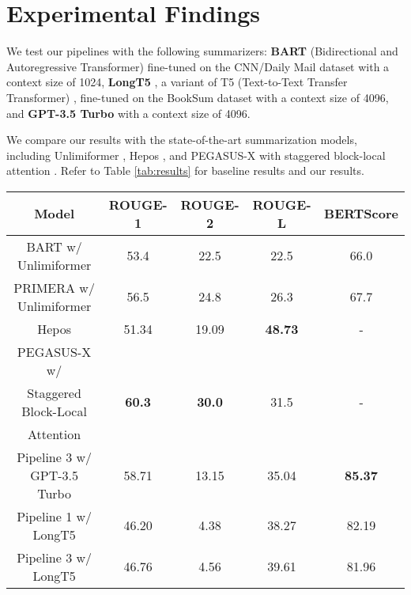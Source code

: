 \section{Experimental Findings}

We test our pipelines with the following summarizers: \textbf{BART} (Bidirectional
and Autoregressive Transformer) \cite{lewis-etal-2020-bart} fine-tuned on the
CNN/Daily Mail dataset \cite{nallapati2016abstractive} with a context size of 1024,
\textbf{LongT5} \cite{guo2021longt5}, a variant of T5 (Text-to-Text Transfer
Transformer) \cite{raffel2020exploring}, fine-tuned on the BookSum dataset with
a context size of 4096, and \textbf{GPT-3.5 Turbo} \cite{brown2020language} with a
context size of 4096.

We compare our results with the state-of-the-art summarization models, including
Unlimiformer \cite{bertsch2023unlimiformer}, Hepos \cite{huang-etal-2021-efficient},
and PEGASUS-X with staggered block-local attention \cite{phang2022investigating}.
Refer to Table \ref{tab:results} for baseline results and our results.

\begin{table*}[!ht]
	\centering

	\begin{tabular}{c c c c c}
		\hline
		\textbf{Model} & \textbf{ROUGE-1} & \textbf{ROUGE-2} & \textbf{ROUGE-L} &
		\textbf{BERTScore} \\
		\hline
		BART w/ Unlimiformer & 53.4 & 22.5 & 22.5 & 66.0 \\
		PRIMERA w/ Unlimiformer & 56.5 & 24.8 & 26.3 & 67.7 \\
		Hepos & 51.34 & 19.09 & \textbf{48.73} & - \\
		PEGASUS-X w/ & & & & \\
		Staggered Block-Local & \textbf{60.3} & \textbf{30.0} & 31.5 & - \\
		Attention & & & & \\
		\hline
		Pipeline 3 w/ GPT-3.5 Turbo & 58.71 & 13.15 & 35.04 & \textbf{85.37} \\
		Pipeline 1 w/ LongT5 & 46.20 & 4.38 & 38.27 & 82.19 \\
		Pipeline 3 w/ LongT5 & 46.76 & 4.56 & 39.61 & 81.96 \\
		\hline
	\end{tabular}

	\caption{Automatic evaluation results on GovReport dataset. The best scores are
	highlighted in \textbf{bold}.}
	\label{tab:results}
\end{table*}
